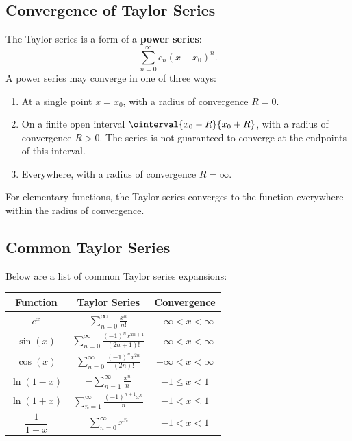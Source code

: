 \documentclass{article}
\begin{document}
\subsection{Convergence of Taylor Series}
The Taylor series is a form of a \textbf{power series}:
\begin{equation*}
    \sum_{n=0}^{\infty} c_n {\left( x - x_0 \right)}^n.
\end{equation*}
A power series may converge in one of three ways:
\begin{enumerate}[label=(\arabic*)]
    \item At a single point \(x = x_0\), with a radius of convergence
          \(R = 0\).
    \item On a finite open interval \(\ointerval{x_0 - R}{x_0 + R}\),
          with a radius of convergence \(R > 0\). The series is not
          guaranteed to converge at the endpoints of this interval.
    \item Everywhere, with a radius of convergence \(R = \infty\).
\end{enumerate}
For elementary functions, the Taylor series converges to the function
everywhere within the radius of convergence.
\subsection{Common Taylor Series}
Below are a list of common Taylor series expansions:
\begin{table}[H]
    \centering
    \begin{tabular}{c c c}
        \toprule
        \textbf{Function}             & \textbf{Taylor Series}                                                                           & \textbf{Convergence}     \\
        \midrule
        \(e^x\)                       & \(\displaystyle\sum_{n=0}^{\infty} \frac{x^n}{n!}\)                                              & \(-\infty < x < \infty\) \\
        \(\sin{\left( x \right)}\)    & \(\displaystyle\sum_{n=0}^{\infty} \frac{{\left( -1 \right)}^n x^{2n+1}}{\left( 2n+1 \right)!}\) & \(-\infty < x < \infty\) \\
        \(\cos{\left( x \right)}\)    & \(\displaystyle\sum_{n=0}^{\infty} \frac{{\left( -1 \right)}^n x^{2n}}{\left( 2n \right)!}\)     & \(-\infty < x < \infty\) \\
        \(\ln{\left( 1 - x \right)}\) & \(\displaystyle-\sum_{n=1}^{\infty} \frac{x^n}{n}\)                                              & \(-1 \leqslant x < 1\)   \\
        \(\ln{\left( 1 + x \right)}\) & \(\displaystyle\sum_{n=1}^{\infty} \frac{{\left( -1 \right)}^{n+1} x^n}{n}\)                     & \(-1 < x \leqslant 1\)   \\
        \(\dfrac{1}{1 - x}\)          & \(\displaystyle\sum_{n=0}^{\infty} x^n\)                                                         & \(-1 < x < 1\)           \\
        \bottomrule
    \end{tabular}
\end{table}
\end{document}
